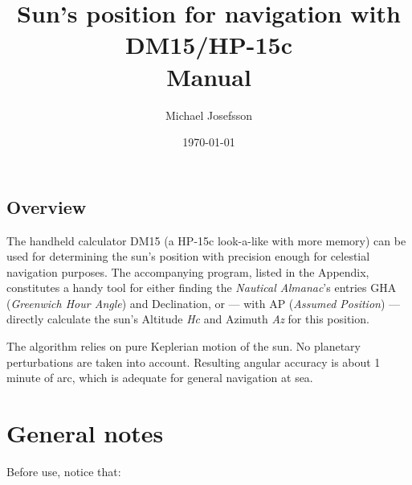 \documentclass[swedish,a4paper,onepage, 11pt]{scrbook}
\begin{document}
\newcommand{\tavla}[1]{\reversemarginpar{ \rule[-10mm]{0.1mm}{#1cm}}}
\newcommand{\svarsrad}{\begin{flushright} \rule{7cm}{0.2mm} \end{flushright}}
\newcommand{\asm}[1]{\texttt{\textbf{#1}}}

\newcommand{\startex}[1]{\textbf{Example}\begin{quote}#1\end{quote}}
\newcommand{\slutex}{\begin{flushright}\rule{1ex}{1ex}\end{flushright}}


\title{Sun's position for navigation with DM15/HP-15c\\{}Manual\\{}}

\author{Michael Josefsson}
\date{\today}
\maketitle

\addtolength{\evensidemargin}{-2.0cm}
\addtolength{\oddsidemargin}{2.0cm}

\subsection*{Overview}

The handheld calculator DM15 (a HP-15c look-a-like with more memory) can be used for determining the sun's position with precision enough for celestial navigation purposes. The accompanying program, listed in the Appendix, constitutes a handy tool for either finding the \emph{Nautical Almanac}'s entries GHA (\emph{Greenwich Hour Angle}) and Declination, or --- with AP (\emph{Assumed Position}) --- directly calculate the sun's Altitude \emph{Hc} and Azimuth \emph{Az} for this position.

The algorithm relies on pure Keplerian motion of the sun. No planetary perturbations are taken into account. Resulting angular accuracy is about 1 minute of arc, which is adequate for general navigation at sea.

\section*{General notes} 

Before use, notice that: 
\end{document}
